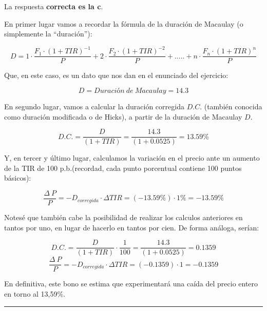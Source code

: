 \documentclass[
  letterpaper,
  DIV=11,
  numbers=noendperiod]{scrartcl}
\begin{document}
\begin{tcolorbox}[enhanced jigsaw, colframe=quarto-callout-note-color-frame, opacityback=0, colback=white, leftrule=.75mm, left=2mm, breakable, arc=.35mm, rightrule=.15mm, toprule=.15mm, bottomrule=.15mm]
\begin{minipage}[t]{5.5mm}
\textcolor{quarto-callout-note-color}{\faInfo}
\end{minipage}%
\begin{minipage}[t]{\textwidth - 5.5mm}

La respuesta \textbf{correcta es la c}.

En primer lugar vamos a recordar la fórmula de la duración de Macaulay
(o simplemente la ``duración''):

\[D=1\cdot\frac{F_1\cdot\left(1+TIR\right)^{-1}}{P}+2\cdot\frac{F_2\cdot\left(1+TIR\right)^{-2}}{P}+.....+n\cdot\frac{F_n\cdot\left(1+TIR\right)^n}{P}\]

Que, en este caso, es un dato que nos dan en el enunciado del ejercicio:

\[D=Duración\ de\ Macaulay=14.3\]

En segundo lugar, vamos a calcular la duración corregida \(D.C.\)
(también conocida como duración modificada o de Hicks), a partir de la
duración de Macaulay \(D\).

\[D.C.=\frac{D}{(1+TIR)}=\frac{14.3}{(1+0.0525)}=13.59\%\]

Y, en tercer y último lugar, calculamos la variación en el precio ante
un aumento de la TIR de 100 p.b.(recordad, cada punto porcentual
contiene 100 puntos básicos):

\[\frac{\Delta\ P}{P}=-D_{corregida}\cdot\Delta TIR=(-13.59\%)\cdot 1\%=-13.59\% \]

Notesé que también cabe la posibilidad de realizar los calculos
anteriores en tantos por uno, en lugar de hacerlo en tantos por cien. De
forma análoga, serían:

\[D.C.=\frac{D}{(1+TIR)}\cdot \frac{1}{100}=\frac{14.3}{(1+0.0525)}=0.1359\]
\[\frac{\Delta\ P}{P}=-D_{corregida}\cdot\Delta TIR=(-0.1359)\cdot 1=-0.1359\]

En definitiva, este bono se estima que experimentará una caída del
precio entero en torno al 13,59\%.

\end{minipage}%
\end{tcolorbox}

\begin{center}\rule{0.5\linewidth}{0.5pt}\end{center}
\end{document}
